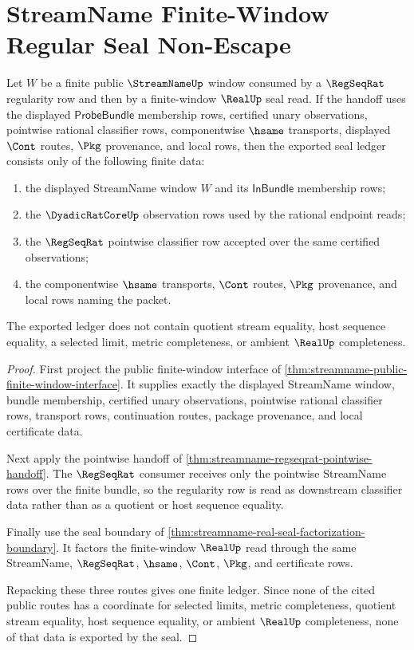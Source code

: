 \section{StreamName Finite-Window Regular Seal Non-Escape}
\label{sec:streamname-finite-window-regular-seal-nonescape}

\begin{theorem}
\label{thm:streamname-finite-window-regularity-real-seal-nonescape}
Let $W$ be a finite public $\StreamNameUp$ window consumed by a $\RegSeqRat$ regularity row and then by a finite-window $\RealUp$ seal read. If the handoff uses the displayed $\mathsf{ProbeBundle}$ membership rows, certified unary observations, pointwise rational classifier rows, componentwise $\hsame$ transports, displayed $\Cont$ routes, $\Pkg$ provenance, and local \NameCert{} rows, then the exported seal ledger consists only of the following finite data:
\begin{enumerate}
\item the displayed StreamName window $W$ and its $\mathsf{InBundle}$ membership rows;
\item the $\DyadicRatCoreUp$ observation rows used by the rational endpoint reads;
\item the $\RegSeqRat$ pointwise classifier row accepted over the same certified observations;
\item the componentwise $\hsame$ transports, $\Cont$ routes, $\Pkg$ provenance, and local \NameCert{} rows naming the packet.
\end{enumerate}
The exported ledger does not contain quotient stream equality, host sequence equality, a selected limit, metric completeness, or ambient $\RealUp$ completeness.
\end{theorem}
\begin{proof}
First project the public finite-window interface of \autoref{thm:streamname-public-finite-window-interface}. It supplies exactly the displayed StreamName window, bundle membership, certified unary observations, pointwise rational classifier rows, transport rows, continuation routes, package provenance, and local certificate data.

Next apply the pointwise handoff of \autoref{thm:streamname-regseqrat-pointwise-handoff}. The $\RegSeqRat$ consumer receives only the pointwise StreamName rows over the finite bundle, so the regularity row is read as downstream classifier data rather than as a quotient or host sequence equality.

Finally use the seal boundary of \autoref{thm:streamname-real-seal-factorization-boundary}. It factors the finite-window $\RealUp$ read through the same StreamName, $\RegSeqRat$, $\hsame$, $\Cont$, $\Pkg$, and certificate rows.

Repacking these three routes gives one finite ledger. Since none of the cited public routes has a coordinate for selected limits, metric completeness, quotient stream equality, host sequence equality, or ambient $\RealUp$ completeness, none of that data is exported by the seal.
\end{proof}

